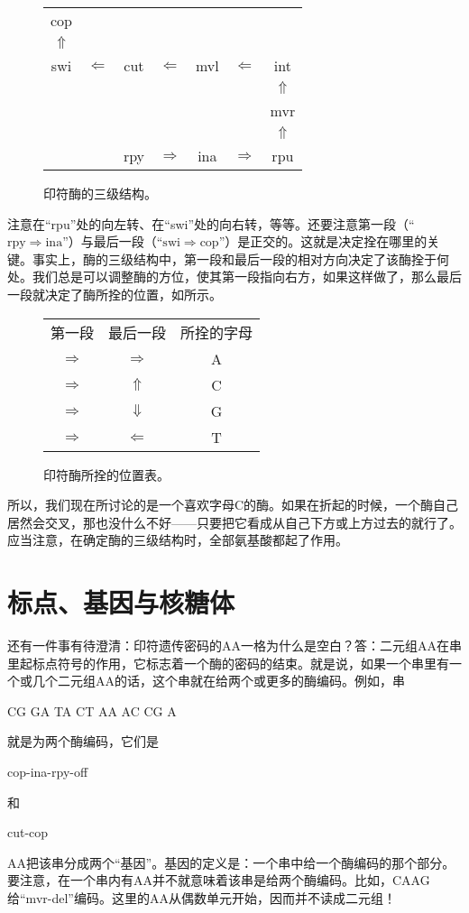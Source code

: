 \begin{figure}
\begin{tabular}{*7c}
cop\\
$\Uparrow$\\
swi & $\Leftarrow$ & cut & $\Leftarrow$ & mvl & $\Leftarrow$ & int\\
&&&&&& $\Uparrow$ \\
&&&&&& mvr \\
&&&&&& $\Uparrow$ \\
&& rpy & $\Rightarrow$ & ina & $\Rightarrow$ & rpu
\end{tabular}
\caption{印符酶的三级结构。}
\end{figure}

注意在“rpu”处的向左转、在“swi”处的向右转，等等。还要注意第一段（“$\mathrm{rpy}\Rightarrow\mathrm{ina}$”）与最后一段（“$\mathrm{swi}\Rightarrow\mathrm{cop}$”）是正交的。这就是决定拴在哪里的关键。事实上，酶的三级结构中，第一段和最后一段的相对方向决定了该酶拴于何处。我们总是可以调整酶的方位，使其第一段指向右方，如果这样做了，那么最后一段就决定了酶所拴的位置，如所示。

\begin{figure}
\begin{tabular}{*3c}
第一段 & 最后一段 & 所拴的字母 \\
$\Rightarrow$ & $\Rightarrow$ & A \\
$\Rightarrow$ & $\Uparrow$ & C \\
$\Rightarrow$ & $\Downarrow$ & G \\
$\Rightarrow$ & $\Leftarrow$ & T
\end{tabular}
\caption{印符酶所拴的位置表。}
\end{figure}

所以，我们现在所讨论的是一个喜欢字母C的酶。如果在折起的时候，一个酶自己居然会交叉，那也没什么不好——只要把它看成从自己下方或上方过去的就行了。应当注意，在确定酶的三级结构时，全部氨基酸都起了作用。

\section{标点、基因与核糖体}

还有一件事有待澄清：印符遗传密码的AA一格为什么是空白？答：二元组AA在串里起标点符号的作用，它标志着一个酶的密码的结束。就是说，如果一个串里有一个或几个二元组AA的话，这个串就在给两个或更多的酶编码。例如，串
\begin{center}
CG GA TA CT AA AC CG A
\end{center}
就是为两个酶编码，它们是
\begin{center}
cop-ina-rpy-off
\end{center}
和
\begin{center}
cut-cop
\end{center}
AA把该串分成两个“基因”。基因的定义是：一个串中给一个酶编码的那个部分。要注意，在一个串内有AA并不就意味着该串是给两个酶编码。比如，CAAG给“mvr-del”编码。这里的AA从偶数单元开始，因而并不读成二元组！

